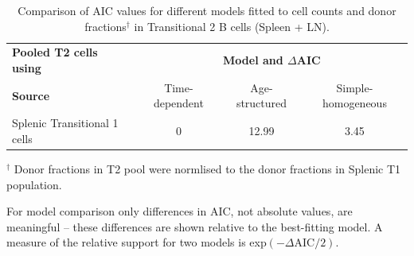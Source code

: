 \documentclass[11pt]{article}
\begin{document}
\begin{table}[h!]
	\begin{center}
		\renewcommand{\arraystretch}{1.25}
		\begin{tabular}{ l c c c } 
			\toprule 
			\multicolumn{1}{l}{\textbf{Pooled T2 cells using}} & \multicolumn{3}{c}{\textbf{Model and $\Delta$AIC}} \\
			\cline{2-4}
			\textbf{Source}  &  {\small Time-dependent}  &  {\small Age-structured} & {\small Simple-homogeneous} \\ 
			\toprule
			Splenic Transitional 1 cells      & 0      &  12.99 & 3.45  \\ 
			\hline
			\toprule 
		\end{tabular}
	\end{center}
	\caption{\small Comparison of AIC values for different models fitted to cell counts and donor fractions$^{\dagger}$ in Transitional 2 B cells (Spleen + LN).}
	$^{\dagger}$ \footnotesize{Donor fractions in T2 pool were normlised to the donor fractions in Splenic T1 population. }
	\label{tab:T2-AICs}
\end{table} 

\footnotesize{For model comparison only differences in AIC, not absolute values, are meaningful -- these differences are shown relative to the best-fitting model. A measure of the relative support for two models is exp$(- \Delta\text{AIC}/2)$.}
\end{document}

